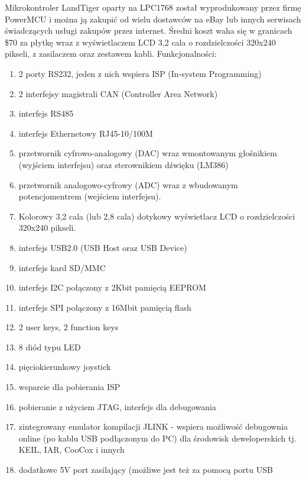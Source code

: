 \documentclass{BscUS}
\begin{document}
Mikrokontroler LandTiger oparty na LPC1768 został wyprodukowany przez firmę PowerMCU i można ją zakupić od wielu dostawców na eBay lub innych serwisach świadczących usługi zakupów przez internet. Średni koszt waha się w granicach \$70 za płytkę wraz z wyświetlaczem LCD 3,2 cala o rozdzielczości 320x240 pikseli, z zasilaczem oraz zestawem kabli. \cite{landtigerDesc}
\newline
Funkcjonalności:
\begin{enumerate} [label=(\alph*)]
\item 2 porty RS232, jeden z nich wspiera ISP (In-system Programming)
\item 2 interfejsy magistrali CAN (Controller Area Network)
\item interfejs RS485
\item interfejs Ethernetowy RJ45-10/100M 
\item przetwornik cyfrowo-analogowy (DAC) wraz wmontowanym głośnikiem (wyjściem interfejsu) oraz sterownikiem dźwięku (LM386)
\item przetwornik analogowo-cyfrowy (ADC) wraz z wbudowanym potencjomentrem (wejściem interfejsu).
\item Kolorowy 3,2 cala (lub 2,8 cala) dotykowy wyświetlacz LCD o rozdzielczości 320x240 pikseli. 
\item interfejs USB2.0 (USB Host oraz USB Device)
\item interfejs kard SD/MMC
\item interfejs I2C połączony z 2Kbit pamięcią EEPROM
\item interfejs SPI połączony z 16Mbit pamięcią flash
\item 2 user keys, 2 function keys
\item 8 diód typu LED
\item pięciokierunkowy joystick
\item wsparcie dla pobierania ISP
\item pobieranie z użyciem JTAG, interfejs dla debugowania
\item zintegrowany emulator kompilacji JLINK - wspiera możliwość debugownia online (po kablu USB podłączonym do PC) dla środowisk deweloperskich tj. KEIL, IAR, CooCox i innych
\item dodatkowe 5V port zasilający (możliwe jest też za pomocą portu USB 
\end{enumerate}
\end{document}
